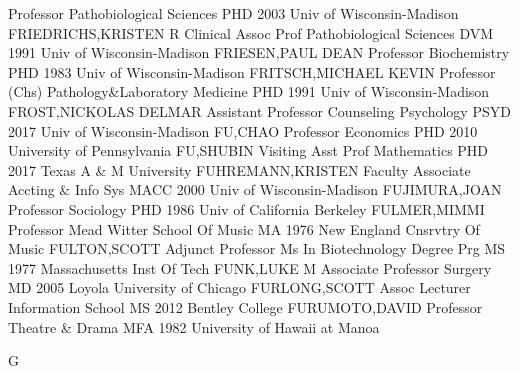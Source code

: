 \documentclass[
]{article}
\begin{document}
\textbar Professor \textbar Pathobiological Sciences \textbar PHD 2003
Univ of Wisconsin-Madison \textbar{} 
\textbar FRIEDRICHS,KRISTEN R \textbar Clinical Assoc Prof
\textbar Pathobiological Sciences \textbar DVM 1991 Univ of
Wisconsin-Madison \textbar{}  \textbar FRIESEN,PAUL DEAN
\textbar Professor \textbar Biochemistry \textbar PHD 1983 Univ of
Wisconsin-Madison \textbar{}  \textbar FRITSCH,MICHAEL KEVIN
\textbar Professor (Chs) \textbar Pathology\&Laboratory Medicine
\textbar PHD 1991 Univ of Wisconsin-Madison \textbar{} 
\textbar FROST,NICKOLAS DELMAR \textbar Assistant Professor
\textbar Counseling Psychology \textbar PSYD 2017 Univ of
Wisconsin-Madison \textbar{}  \textbar FU,CHAO
\textbar Professor \textbar Economics \textbar PHD 2010 University of
Pennsylvania \textbar{}  \textbar FU,SHUBIN
\textbar Visiting Asst Prof \textbar Mathematics \textbar PHD 2017 Texas
A \& M University \textbar{}  \textbar FUHREMANN,KRISTEN
\textbar Faculty Associate \textbar Accting \& Info Sys \textbar MACC
2000 Univ of Wisconsin-Madison \textbar{} 
\textbar FUJIMURA,JOAN \textbar Professor \textbar Sociology
\textbar PHD 1986 Univ of California Berkeley \textbar{} 
\textbar FULMER,MIMMI \textbar Professor \textbar Mead Witter School Of
Music \textbar MA 1976 New England Cnsrvtry Of Music \textbar{}
 \textbar FULTON,SCOTT \textbar Adjunct Professor
\textbar Ms In Biotechnology Degree Prg \textbar MS 1977 Massachusetts
Inst Of Tech \textbar{}  \textbar FUNK,LUKE M
\textbar Associate Professor \textbar Surgery \textbar MD 2005 Loyola
University of Chicago \textbar{}  \textbar FURLONG,SCOTT
\textbar Assoc Lecturer \textbar Information School \textbar MS 2012
Bentley College \textbar{}  \textbar FURUMOTO,DAVID
\textbar Professor \textbar Theatre \& Drama \textbar MFA 1982
University of Hawaii at Manoa \textbar{}  \textbar{}

G

\textbar{}
\end{document}
